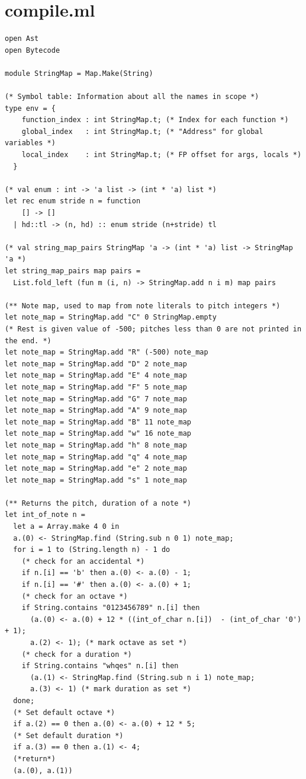 \documentclass[12pt,A4]{book}
\begin{document}
\section{compile.ml}
\begin{verbatim}
open Ast
open Bytecode

module StringMap = Map.Make(String)

(* Symbol table: Information about all the names in scope *)
type env = {
    function_index : int StringMap.t; (* Index for each function *)
    global_index   : int StringMap.t; (* "Address" for global variables *)
    local_index    : int StringMap.t; (* FP offset for args, locals *)
  }

(* val enum : int -> 'a list -> (int * 'a) list *)
let rec enum stride n = function
    [] -> []
  | hd::tl -> (n, hd) :: enum stride (n+stride) tl

(* val string_map_pairs StringMap 'a -> (int * 'a) list -> StringMap 'a *)
let string_map_pairs map pairs =
  List.fold_left (fun m (i, n) -> StringMap.add n i m) map pairs

(** Note map, used to map from note literals to pitch integers *)
let note_map = StringMap.add "C" 0 StringMap.empty
(* Rest is given value of -500; pitches less than 0 are not printed in the end. *)
let note_map = StringMap.add "R" (-500) note_map
let note_map = StringMap.add "D" 2 note_map
let note_map = StringMap.add "E" 4 note_map
let note_map = StringMap.add "F" 5 note_map
let note_map = StringMap.add "G" 7 note_map
let note_map = StringMap.add "A" 9 note_map
let note_map = StringMap.add "B" 11 note_map
let note_map = StringMap.add "w" 16 note_map
let note_map = StringMap.add "h" 8 note_map
let note_map = StringMap.add "q" 4 note_map
let note_map = StringMap.add "e" 2 note_map
let note_map = StringMap.add "s" 1 note_map

(** Returns the pitch, duration of a note *)
let int_of_note n =
  let a = Array.make 4 0 in
  a.(0) <- StringMap.find (String.sub n 0 1) note_map;
  for i = 1 to (String.length n) - 1 do
    (* check for an accidental *)
    if n.[i] == 'b' then a.(0) <- a.(0) - 1;
    if n.[i] == '#' then a.(0) <- a.(0) + 1;
    (* check for an octave *)
    if String.contains "0123456789" n.[i] then
      (a.(0) <- a.(0) + 12 * ((int_of_char n.[i])  - (int_of_char '0') + 1);
      a.(2) <- 1); (* mark octave as set *)
    (* check for a duration *)
    if String.contains "whqes" n.[i] then
      (a.(1) <- StringMap.find (String.sub n i 1) note_map;
      a.(3) <- 1) (* mark duration as set *)
  done;
  (* Set default octave *)
  if a.(2) == 0 then a.(0) <- a.(0) + 12 * 5;
  (* Set default duration *)
  if a.(3) == 0 then a.(1) <- 4;
  (*return*)
  (a.(0), a.(1))
  


\end{verbatim}
\end{document}
